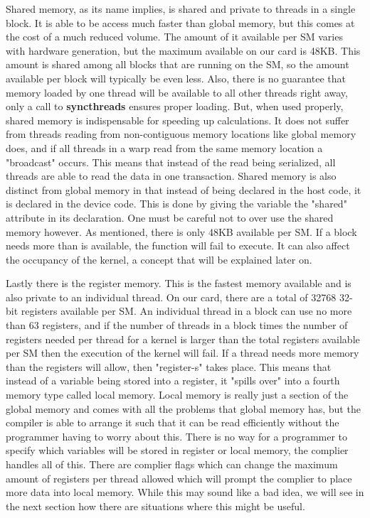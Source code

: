 \documentclass[12pt]{book}
\newcommand{\comm}[1]{\textbf{#1}}
\begin{document}
Shared memory, as its name implies, is shared and private to threads in a single block. It is able to be access much faster than global memory, but this comes at the cost of a much reduced volume. The amount of it available per SM varies with hardware generation, but the maximum available on our card is 48KB. This amount is shared among all blocks that are running on the SM, so the amount available per block will typically be even less. Also, there is no guarantee that memory loaded by one thread will be available to all other threads right away, only a call to \comm{syncthreads} ensures proper loading. But, when used properly, shared memory is indispensable for speeding up calculations. It does not suffer from threads reading from non-contiguous memory locations like global memory does, and if all threads in a warp read from the same memory location a "broadcast" occurs. This means that instead of the read being serialized, all threads are able to read the data in one transaction. Shared memory is also distinct from global memory in that instead of being declared in the host code, it is declared in the device code. This is done by giving the variable the "shared" attribute in its declaration. One must be careful not to over use the shared memory however. As mentioned, there is only 48KB available per SM. If a block needs more than is available, the function will fail to execute. It can also affect the occupancy of the kernel, a concept that will be explained later on.

Lastly there is the register memory. This is the fastest memory available and is also private to an individual thread. On our card, there are a total of 32768 32-bit registers available per SM. An individual thread in a block can use no more than 63 registers, and if the number of threads in a block times the number of registers needed per thread for a kernel is larger than the total registers available per SM then the execution of the kernel will fail. If a thread needs more memory than the registers will allow, then "register-s\pilling" takes place. This means that instead of a variable being stored into a register, it "spills over" into a fourth memory type called local memory. Local memory is really just a section of the global memory and comes with all the problems that global memory has, but the compiler is able to arrange it such that it can be read efficiently without the programmer having to worry about this. There is no way for a programmer to specify which variables will be stored in register or local memory, the complier handles all of this. There are complier flags which can change the maximum amount of registers per thread allowed which will prompt the complier to place more data into local memory. While this may sound like a bad idea, we will see in the next section how there are situations where this might be useful.
\end{document}
